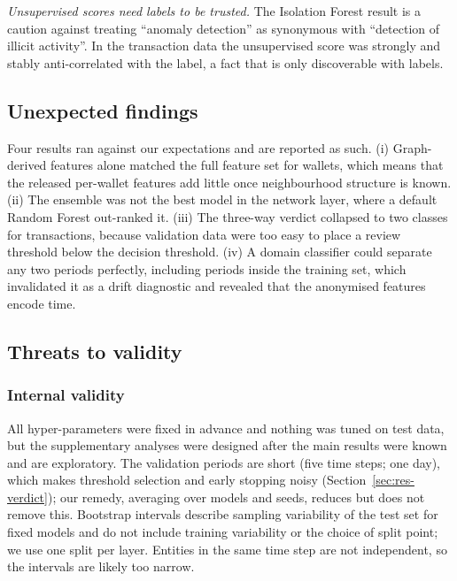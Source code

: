 \emph{Unsupervised scores need labels to be trusted.} The Isolation Forest result is a caution against treating ``anomaly detection'' as synonymous with ``detection of illicit activity''. In the transaction data the unsupervised score was strongly and stably anti-correlated with the label, a fact that is only discoverable with labels.

\subsection{Unexpected findings}
Four results ran against our expectations and are reported as such. (i) Graph-derived features alone matched the full feature set for wallets, which means that the released per-wallet features add little once neighbourhood structure is known. (ii) The ensemble was not the best model in the network layer, where a default Random Forest out-ranked it. (iii) The three-way verdict collapsed to two classes for transactions, because validation data were too easy to place a review threshold below the decision threshold. (iv) A domain classifier could separate any two periods perfectly, including periods inside the training set, which invalidated it as a drift diagnostic and revealed that the anonymised features encode time.

\subsection{Threats to validity}\label{sec:threats}
\subsubsection{Internal validity} All hyper-parameters were fixed in advance and nothing was tuned on test data, but the supplementary analyses were designed after the main results were known and are exploratory. The validation periods are short (five time steps; one day), which makes threshold selection and early stopping noisy (Section~\ref{sec:res-verdict}); our remedy, averaging over models and seeds, reduces but does not remove this. Bootstrap intervals describe sampling variability of the test set for fixed models and do not include training variability or the choice of split point; we use one split per layer. Entities in the same time step are not independent, so the intervals are likely too narrow.

